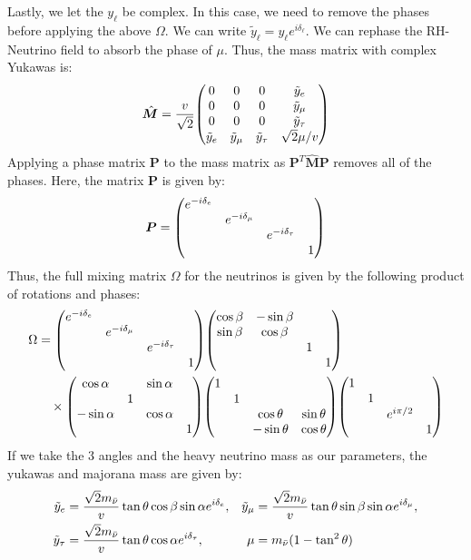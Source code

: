 Lastly, we let the \(y_{\ell}\) be complex. In this case, we need to remove the
phases before applying the above \(\Omega\). We can write
\(\tilde{y}_{\ell}= y_{\ell}e^{i\delta_{\ell}}\). We can rephase the RH-Neutrino field
to absorb the phase of \(\mu\). Thus, the mass matrix with complex Yukawas is:
\begin{align}
	\hat{\bm{M}} = \frac{v}{\sqrt{2}}\mqty(
	0             & 0               & 0                & \tilde{y}_{e}    \\
	0             & 0               & 0                & \tilde{y}_{\mu}  \\
	0             & 0               & 0                & \tilde{y}_{\tau} \\
	\tilde{y}_{e} & \tilde{y}_{\mu} & \tilde{y}_{\tau} & \sqrt{2}\mu/v    \\
	)
\end{align}
Applying a phase matrix \(\bm{P}\) to the mass matrix as \(\bm{P}^{T}\hat{\bm{M}}\bm{P}\)
removes all of the phases. Here, the matrix \(\bm{P}\) is given by:
\begin{align}
	\bm{P}
	=
	\mqty(\dmat{
		e^{-i\delta_{e}} ,
		e^{-i\delta_{\mu}},
		e^{-i\delta_{\tau}},
		1
	})
\end{align}
Thus, the full mixing matrix \(\Omega\) for the neutrinos is given by the following product of
rotations and phases:
\begin{align}
	\Omega      & =
	\mqty(\dmat{
		e^{-i\delta_{e}} ,
		e^{-i\delta_{\mu}},
		e^{-i\delta_{\tau}},
		1
	})
	\mqty(
	\dmat{
	\cos\beta   & -\sin\beta                   \\
	\sin\beta   & \cos\beta,1,1}
	)                                          \\
	            & \quad\times
	\mqty(\dmat{
	\cos\alpha  &                & \sin\alpha  \\
	            & 1              &             \\
	-\sin\alpha &                & \cos\alpha,
		1
	})
	\mqty(\dmat{
		1,1,
	\cos\theta  & \sin\theta                   \\
	-\sin\theta & \cos\theta                   \\
	})
	\mqty(\dmat{1,1,e^{i\pi/2},1})
\end{align}
If we take the 3 angles and the heavy neutrino mass as our parameters, the
yukawas and majorana mass are given by:
\begin{align}
	\tilde{y}_{e}    & =\frac{\sqrt{2}m_{\bar{\nu}}}{v}\tan\theta\cos\beta\sin\alpha e^{i\delta_{e}},   &
	\tilde{y}_{\mu}  & =\frac{\sqrt{2}m_{\bar{\nu}}}{v}\tan\theta\sin\beta\sin\alpha e^{i\delta_{\mu}},   \\
	\tilde{y}_{\tau} & =\frac{\sqrt{2}m_{\bar{\nu}}}{v}\tan\theta\cos\alpha e^{i\delta_{\tau}},         &
	\mu              & = m_{\bar{\nu}}(1-\tan^2\theta)
\end{align}
